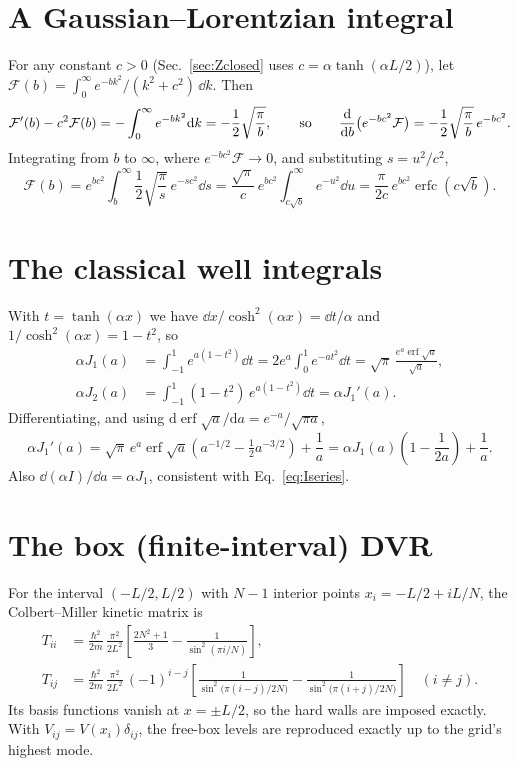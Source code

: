 \documentclass[11pt]{article}
\numberwithin{equation}{section}
\providecommand{\erf}{\operatorname{erf}}
\providecommand{\erfc}{\operatorname{erfc}}
\begin{document}
\section{A Gaussian--Lorentzian integral}
\label{app:gaussint}
For any constant $c>0$ (Sec.~\ref{sec:Zclosed} uses $c=\alpha\tanh(\alpha L/2)$), let $\mathcal F(b)=\int_0^\infty e^{-bk^2}/(k^2+c^2)\,\dd k$. Then
\[
\mathcal F'(b)-c^2\mathcal F(b)=-\int_0^\infty e^{-bk^2}\dd k=-\frac12\sqrt{\frac{\pi}{b}},
\qquad\text{so}\qquad
\dv{b}\big(e^{-bc^2}\mathcal F\big)=-\frac12\sqrt{\frac\pi b}\,e^{-bc^2}.
\]
Integrating from $b$ to $\infty$, where $e^{-bc^2}\mathcal F\to0$, and substituting $s=u^2/c^2$,
\[
\mathcal F(b)=e^{bc^2}\int_b^\infty\frac12\sqrt{\frac\pi s}\,e^{-sc^2}\dd s=\frac{\sqrt\pi}{c}\,e^{bc^2}\int_{c\sqrt b}^\infty e^{-u^2}\dd u=\frac{\pi}{2c}\,e^{bc^2}\erfc\!\left(c\sqrt b\right).
\]

\section{The classical well integrals}
\label{app:classint}
With $t=\tanh(\alpha x)$ we have $\dd x/\cosh^2(\alpha x)=\dd t/\alpha$ and $1/\cosh^2(\alpha x)=1-t^2$, so
\begin{align*}
\alpha J_1(a)&=\int_{-1}^1e^{a(1-t^2)}\dd t=2e^a\int_0^1e^{-at^2}\dd t=\sqrt\pi\,\frac{e^a\erf\sqrt a}{\sqrt a},\\
\alpha J_2(a)&=\int_{-1}^1(1-t^2)\,e^{a(1-t^2)}\dd t=\alpha J_1'(a).
\end{align*}
Differentiating, and using $\mathrm{d}\erf\sqrt a/\mathrm{d}a=e^{-a}/\sqrt{\pi a}$,
\[
\alpha J_1'(a)=\sqrt\pi\,e^a\erf\sqrt a\left(a^{-1/2}-\tfrac12a^{-3/2}\right)+\frac1a=\alpha J_1(a)\left(1-\frac1{2a}\right)+\frac1a .
\]
Also $\dd(\alpha I)/\dd a=\alpha J_1$, consistent with Eq.~\eqref{eq:Iseries}.

\section{The box (finite-interval) DVR}
\label{app:sinedvr}
For the interval $(-L/2,L/2)$ with $N-1$ interior points $x_i=-L/2+iL/N$, the Colbert--Miller kinetic matrix \cite{colbertmiller1992} is
\begin{align*}
T_{ii}&=\frac{\hbar^2}{2m}\,\frac{\pi^2}{2L^2}\left[\frac{2N^2+1}{3}-\frac{1}{\sin^2(\pi i/N)}\right],\\
T_{ij}&=\frac{\hbar^2}{2m}\,\frac{\pi^2}{2L^2}\,(-1)^{i-j}\left[\frac{1}{\sin^2\!\big(\pi(i-j)/2N\big)}-\frac{1}{\sin^2\!\big(\pi(i+j)/2N\big)}\right]\quad(i\neq j).
\end{align*}
Its basis functions vanish at $x=\pm L/2$, so the hard walls are imposed exactly. With $V_{ij}=V(x_i)\delta_{ij}$, the free-box levels are reproduced exactly up to the grid's highest mode.
\end{document}
